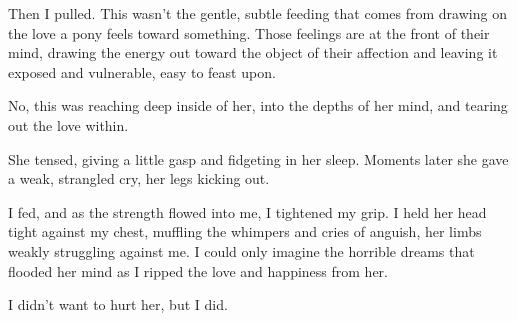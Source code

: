 Then I pulled. This wasn’t the gentle, subtle feeding that comes from drawing on the love a pony feels toward something. Those feelings are at the front of their mind, drawing the energy out toward the object of their affection and leaving it exposed and vulnerable, easy to feast upon.

No, this was reaching deep inside of her, into the depths of her mind, and tearing out the love within.

She tensed, giving a little gasp and fidgeting in her sleep. Moments later she gave a weak, strangled cry, her legs kicking out.

I fed, and as the strength flowed into me, I tightened my grip. I held her head tight against my chest, muffling the whimpers and cries of anguish, her limbs weakly struggling against me. I could only imagine the horrible dreams that flooded her mind as I ripped the love and happiness from her.

I didn’t want to hurt her, but I did.